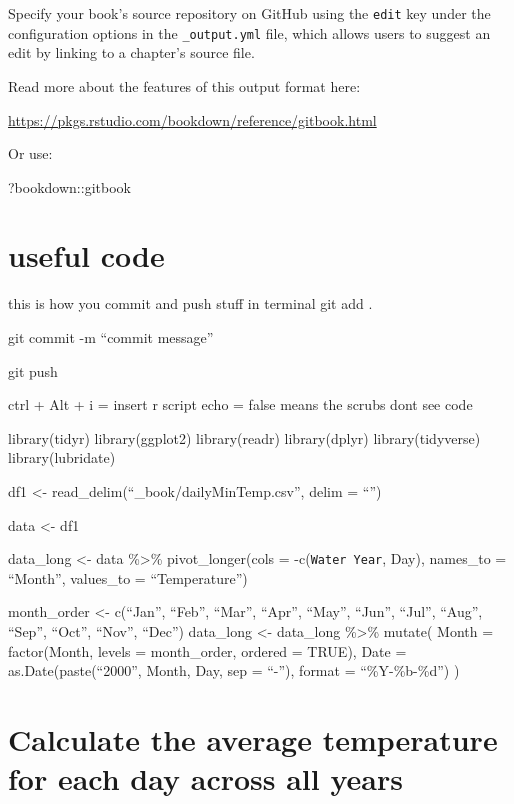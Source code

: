 \documentclass[
]{book}
\newenvironment{Shaded}{\begin{snugshade}}{\end{snugshade}}
\newcommand{\NormalTok}[1]{#1}
\newcommand{\SpecialCharTok}[1]{\textcolor[rgb]{0.00,0.00,0.00}{#1}}
\theoremstyle{definition}
\theoremstyle{definition}
\theoremstyle{definition}
\theoremstyle{definition}
\theoremstyle{remark}
\begin{document}
Specify your book's source repository on GitHub using the \texttt{edit} key under the configuration options in the \texttt{\_output.yml} file, which allows users to suggest an edit by linking to a chapter's source file.

Read more about the features of this output format here:

\url{https://pkgs.rstudio.com/bookdown/reference/gitbook.html}

Or use:

\begin{Shaded}
\begin{Highlighting}[]
\NormalTok{?bookdown}\SpecialCharTok{::}\NormalTok{gitbook}
\end{Highlighting}
\end{Shaded}

\hypertarget{useful-code}{%
\chapter{useful code}\label{useful-code}}

this is how you commit and push stuff in terminal
git add .

git commit -m ``commit message''

git push

ctrl + Alt + i = insert r script
echo = false means the scrubs dont see code

library(tidyr)
library(ggplot2)
library(readr)
library(dplyr)
library(tidyverse)
library(lubridate)

df1 \textless- read\_delim(``\_book/dailyMinTemp.csv'', delim = ``\textbar{}'')

data \textless- df1

data\_long \textless- data \%\textgreater\%
pivot\_longer(cols = -c(\texttt{Water\ Year}, Day),
names\_to = ``Month'',
values\_to = ``Temperature'')

month\_order \textless- c(``Jan'', ``Feb'', ``Mar'', ``Apr'', ``May'', ``Jun'', ``Jul'', ``Aug'', ``Sep'', ``Oct'', ``Nov'', ``Dec'')
data\_long \textless- data\_long \%\textgreater\%
mutate(
Month = factor(Month, levels = month\_order, ordered = TRUE),
Date = as.Date(paste(``2000'', Month, Day, sep = ``-''), format = ``\%Y-\%b-\%d'')
)

\hypertarget{calculate-the-average-temperature-for-each-day-across-all-years}{%
\chapter{Calculate the average temperature for each day across all years}\label{calculate-the-average-temperature-for-each-day-across-all-years}}
\end{document}
